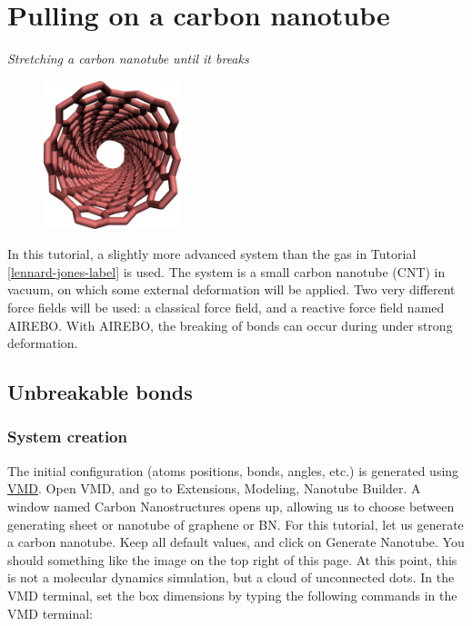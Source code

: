 \chapter{Pulling on a carbon nanotube}
\label{carbon-nanotube-label}

\vspace{-1cm} \noindent \textcolor{graytitle}{\textit{{\Large Stretching a carbon nanotube until it breaks}}\vspace{0.5cm} }

\noindent \hspace{-0.45cm}\begin{figure}
\includegraphics[width=4cm]{tutorials/level1/breaking-a-carbon-nanotube/CNT_light.png}
\end{figure}

\noindent In this tutorial, a slightly more advanced system than the gas
in Tutorial \ref{lennard-jones-label} is used.
The system is a small carbon nanotube (CNT) in vacuum, on which some external 
deformation will be applied. Two very different force fields will be used: 
a classical force field, and a reactive force field named AIREBO. With AIREBO,
the breaking of bonds can occur during under strong deformation.

\section{Unbreakable bonds}

\noindent \subsection{System creation}

The initial configuration (atoms positions, bonds, angles,
etc.) is generated using \href{https://www.ks.uiuc.edu/Research/vmd/}{VMD}. Open VMD,
and go to Extensions, Modeling, Nanotube Builder. A window
named Carbon Nanostructures opens up, allowing us to choose
between generating sheet or nanotube of graphene or BN. For
this tutorial, let us generate a carbon nanotube.
Keep all default values, and click on Generate
Nanotube. You should something like the image on the top right 
of this page.
At this point, this is not a molecular dynamics simulation,
but a cloud of unconnected dots. In the VMD terminal, set the
box dimensions by typing the following commands in the VMD terminal:

